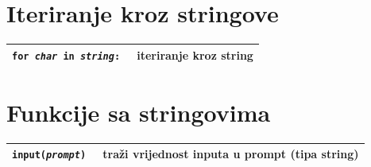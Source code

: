 \documentclass[10pt]{article}
\begin{document}
    \section*{\color{NavyBlue} Iteriranje kroz stringove}
    \begin{tabular}{|>{\tt}p{9.00cm}|>{}p{15.50cm}|}
        \hline
        for \textit{char} in \textit{string}: & iteriranje kroz string
        \\ \hline
    \end{tabular}
    
    \section*{\color{NavyBlue} Funkcije sa stringovima}
    \begin{tabular}{|>{\tt}p{9.00cm}|>{}p{15.50cm}|}
        \hline
        input(\textit{prompt}) & traži vrijednost inputa u prompt (tipa string)
        \\ \hline
    \end{tabular}
\end{document}
